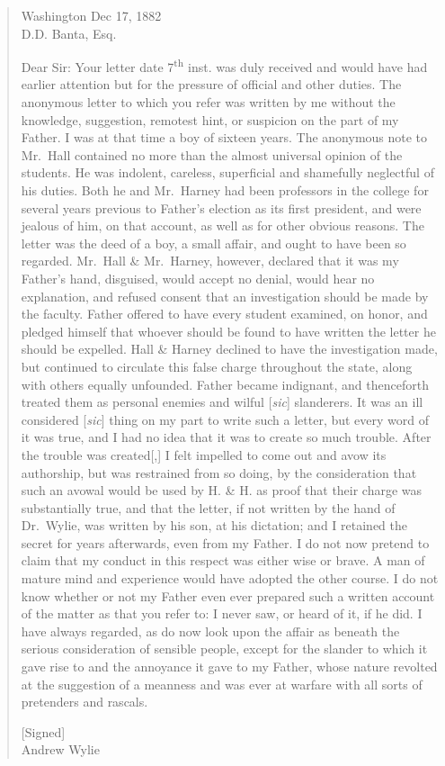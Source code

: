 \documentclass[
  american,
  letterpaper,
]{scrreprt}
\begin{document}
\begin{quote}
Washington Dec 17, 1882\\
D.D. Banta, Esq.

Dear Sir: Your letter date 7\textsuperscript{th} inst. was duly received
and would have had earlier attention but for the pressure of official
and other duties. The anonymous letter to which you refer was written by
me without the knowledge, suggestion, remotest hint, or suspicion on the
part of my Father. I was at that time a boy of sixteen years. The
anonymous note to Mr.~Hall contained no more than the almost universal
opinion of the students. He was indolent, careless, superficial and
shamefully neglectful of his duties. Both he and Mr.~Harney had been
professors in the college for several years previous to Father's
election as its first president, and were jealous of him, on that
account, as well as for other obvious reasons. The letter was the deed
of a boy, a small affair, and ought to have been so regarded. Mr.~Hall
\& Mr.~Harney, however, declared that it was my Father's hand,
disguised, would accept no denial, would hear no explanation, and
refused consent that an investigation should be made by the faculty.
Father offered to have every student examined, on honor, and pledged
himself that whoever should be found to have written the letter he
should be expelled. Hall \& Harney declined to have the investigation
made, but continued to circulate this false charge throughout the state,
along with others equally unfounded. Father became indignant, and
thenceforth treated them as personal enemies and wilful {[}\emph{sic}{]}
slanderers. It was an ill considered {[}\emph{sic}{]} thing on my part
to write such a letter, but every word of it was true, and I had no idea
that it was to create so much trouble. After the trouble was
created{[},{]} I felt impelled to come out and avow its authorship, but
was restrained from so doing, by the consideration that such an avowal
would be used by H. \& H. as proof that their charge was substantially
true, and that the letter, if not written by the hand of Dr.~Wylie, was
written by his son, at his dictation; and I retained the secret for
years afterwards, even from my Father. I do not now pretend to claim
that my conduct in this respect was either wise or brave. A man of
mature mind and experience would have adopted the other course. I do not
know whether or not my Father even ever prepared such a written account
of the matter as that you refer to: I never saw, or heard of it, if he
did. I have always regarded, as do now look upon the affair as beneath
the serious consideration of sensible people, except for the slander to
which it gave rise to and the annoyance it gave to my Father, whose
nature revolted at the suggestion of a meanness and was ever at warfare
with all sorts of pretenders and rascals.

{[}Signed{]}\\
Andrew Wylie
\end{quote}
\end{document}
